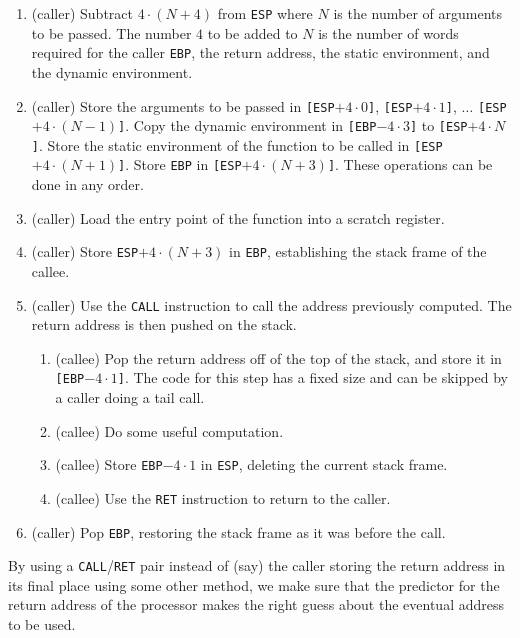 \begin{enumerate}
\item (caller) Subtract $4 \cdot (N + 4)$ from \texttt{ESP} where $N$
  is the number of arguments to be passed.  The number $4$ to be added
  to $N$ is the number of words required for the caller \texttt{EBP},
  the return address, the static environment, and the dynamic environment.
\item (caller) Store the arguments to be passed in
  \texttt{[ESP$+ 4 \cdot 0$]},
  \texttt{[ESP$+ 4 \cdot 1$]},
  $\ldots$
  \texttt{[ESP$+ 4 \cdot (N - 1)$]}.
  Copy the dynamic environment in
  \texttt{[EBP$-4 \cdot 3$]} to
  \texttt{[ESP$+4 \cdot N$]}.
  Store the static environment of the function to be called in
  \texttt{[ESP$+4 \cdot (N + 1)$]}.
  Store \texttt{EBP} in
  \texttt{[ESP$+4 \cdot (N + 3)$]}.
  These operations can be done in any order.
\item (caller) Load the entry point of the function into a scratch
  register.
\item (caller) Store \texttt{ESP$+4 \cdot (N + 3)$} in \texttt{EBP},
  establishing the stack frame of the callee.
\item (caller) Use the \texttt{CALL} instruction to call the address
  previously computed.  The return address is then pushed on the
  stack.
  \begin{enumerate}
  \item (callee) Pop the return address off of the top of the stack,
    and store it in \texttt{[EBP$- 4 \cdot 1$]}.  The code for this
    step has a fixed size and can be skipped by a caller doing a tail
    call.
  \item (callee) Do some useful computation.
  \item (callee) Store \texttt{EBP$- 4 \cdot 1$} in \texttt{ESP},
    deleting the current stack frame.
  \item (callee) Use the \texttt{RET} instruction to return to the
    caller.
  \end{enumerate}
\item (caller) Pop \texttt{EBP}, restoring the stack frame as it was
  before the call.
\end{enumerate}

By using a \texttt{CALL}/\texttt{RET} pair instead of (say) the caller
storing the return address in its final place using some other method,
we make sure that the predictor for the return address of the
processor makes the right guess about the eventual address to be
used.

